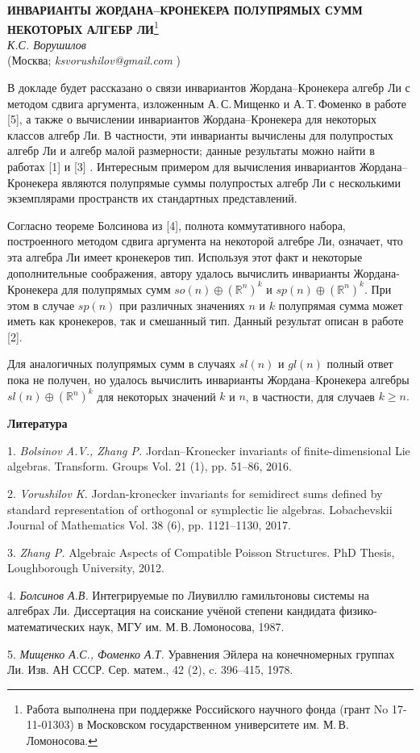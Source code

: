 \begin{center}{ \bf  ИНВАРИАНТЫ ЖОРДАНА--КРОНЕКЕРА ПОЛУПРЯМЫХ СУММ НЕКОТОРЫХ АЛГЕБР ЛИ}\footnote{Работа выполнена при поддержке Российского научного фонда (грант No 17-11-01303) в Московском государственном университете им. М.\,В. Ломоносова.}\\
{\it К.С. Ворушилов } \\
(Москва; {\it ksvorushilov@gmail.com} )
\end{center}

В докладе будет рассказано о связи инвариантов Жорда\-на--Кронекера алгебр Ли с методом сдвига аргумента, изложенным А.\,С.\,Мищенко и А.\,Т.\,Фоменко в работе [5], а также о вычислении инвариантов Жордана--Кронекера для некоторых классов алгебр Ли. В частности, эти инварианты вычислены для полупростых алгебр Ли и алгебр малой размерности; данные результаты можно найти в работах [1] и [3] . Интересным примером для вычисления инвариантов Жордана--Кронекера являются полупрямые суммы полупростых алгебр Ли с несколькими экземплярами пространств их стандартных представлений.

Согласно теореме Болсинова из [4], полнота коммутативного набора, построенного методом сдвига аргумента на некоторой алгебре Ли, означает, что эта алгебра Ли имеет кронекеров тип. Используя этот факт и некоторые дополнительные соображения, автору удалось вычислить инварианты Жордана-Кронекера для полупрямых сумм  $so(n)\oplus (\mathbb{R}^n)^k$ и  $sp(n)\oplus (\mathbb{R}^n)^k.$ При этом в случае $sp(n)$ при различных значениях $n$ и $k$ полупрямая сумма может иметь как кронекеров, так и смешанный тип. Данный результат описан в работе [2].

Для аналогичных полупрямых сумм в случаях $sl(n)$ и $gl(n)$ полный ответ пока не получен, но удалось вычислить инварианты Жордана--Кронекера алгебры $sl(n)\oplus (\mathbb{R}^n)^k$ для некоторых значений $k$ и $n$, в частности, для случаев $k\geqslant n.$



\smallskip \centerline{\bf Литература}\nopagebreak

1. {\it Bolsinov A.V., Zhang P.} Jordan–Kronecker invariants of finite-dimensional Lie algebras. Transform. Groups Vol. 21 (1), pp. 51--86, 2016.

2. {\it Vorushilov K.} Jordan-kronecker invariants for semidirect sums defined by standard representation of orthogonal or symp\-lec\-tic lie algebras. Lobachevskii Journal of Mathematics Vol. 38 (6), pp. 1121--1130, 2017.

3. {\it Zhang P.} Algebraic Aspects of Compatible Poisson Struc\-tures. PhD Thesis, Loughborough University, 2012.

4. {\it Болсинов А.В.} Интегрируемые по Лиувиллю гамильтоновы системы на алгебрах Ли. Диссертация на соискание учёной степени кандидата физико-математических наук, МГУ им. М.\,В.\,Ломоносова, 1987.

5. {\it Мищенко А.С., Фоменко А.Т.} Уравнения Эйлера на конечномерных группах Ли. Изв. АН СССР. Сер. матем., 42 (2), c. 396–415, 1978.



